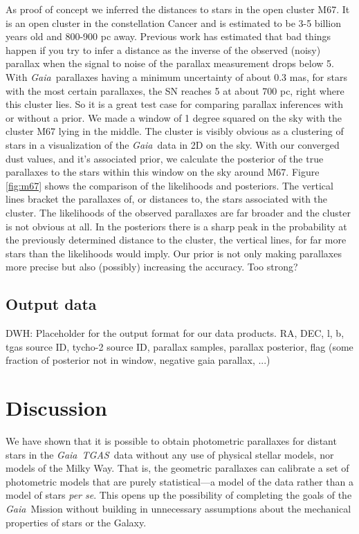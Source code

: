 \documentclass[modern]{aastex61}
\newcommand{\foreign}[1]{\textsl{#1}}
\newcommand{\acronym}[1]{{\small{#1}}}
\newcommand{\project}[1]{\textsl{#1}}
\newcommand{\tgas}{\project{\acronym{TGAS}}}
\newcommand{\gaia}{\project{Gaia}}
\begin{document}
As proof of concept we inferred the distances to stars in the open cluster M67. It is an open cluster in the constellation Cancer and is estimated to be 3-5 billion years old and 800-900 pc away. Previous work has estimated that bad things happen if you try to infer a distance as the inverse of the observed (noisy) parallax when the signal to noise of the parallax measurement drops below 5. With \gaia\ parallaxes having a minimum uncertainty of about 0.3 mas, for stars with the most certain parallaxes, the SN reaches 5 at about 700 pc, right where this cluster lies. So it is a great test case for comparing parallax inferences with or without a prior. We made a window of 1 degree squared on the sky with the cluster M67 lying in the middle. The cluster is visibly obvious as a clustering of stars in a visualization of the \gaia\ data in 2D on the sky. With our converged dust values, and it's associated prior, we calculate the posterior of the true parallaxes to the stars within this window on the sky around M67. Figure \ref{fig:m67} shows the comparison of the likelihoods and posteriors. The vertical lines bracket the parallaxes of, or distances to, the stars associated with the cluster. The likelihoods of the observed parallaxes are far broader and the cluster is not obvious at all. In the posteriors there is a sharp peak in the probability at the previously determined distance to the cluster, the vertical lines, for far more stars than the likelihoods would imply. Our prior is not only making parallaxes more precise but also (possibly) increasing the accuracy. Too strong?


\subsection{Output data}
DWH: Placeholder for the output format for our data products.
RA, DEC, l, b, tgas source ID, tycho-2 source ID, parallax samples, parallax posterior, flag (some fraction of posterior not in window, negative gaia parallax, ...)

\section{Discussion}

We have shown that it is possible to obtain photometric parallaxes for
distant stars in the \gaia\ \tgas\ data without any use of physical stellar
models, nor models of the Milky Way.
That is, the geometric parallaxes can calibrate a set of photometric
models that are purely statistical---a model of the data rather than
a model of stars \foreign{per se}.
This opens up the possibility of completing the goals of the \gaia\ Mission
without building in unnecessary assumptions about the mechanical properties
of stars or the Galaxy.
\end{document}
